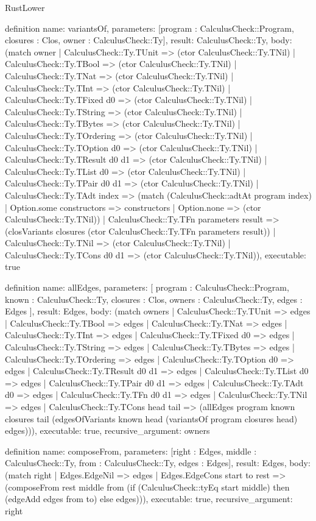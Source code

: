 \begin{lexlean}{RustLower}
\begin{semanticmodule}
definition{
  name: variantsOf,
  parameters: [program : CalculusCheck::Program, closures : Clos, owner : CalculusCheck::Ty],
  result: CalculusCheck::Ty,
  body: (match owner
    | CalculusCheck::Ty.TUnit => (ctor CalculusCheck::Ty.TNil)
    | CalculusCheck::Ty.TBool => (ctor CalculusCheck::Ty.TNil)
    | CalculusCheck::Ty.TNat => (ctor CalculusCheck::Ty.TNil)
    | CalculusCheck::Ty.TInt => (ctor CalculusCheck::Ty.TNil)
    | CalculusCheck::Ty.TFixed d0 => (ctor CalculusCheck::Ty.TNil)
    | CalculusCheck::Ty.TString => (ctor CalculusCheck::Ty.TNil)
    | CalculusCheck::Ty.TBytes => (ctor CalculusCheck::Ty.TNil)
    | CalculusCheck::Ty.TOrdering => (ctor CalculusCheck::Ty.TNil)
    | CalculusCheck::Ty.TOption d0 => (ctor CalculusCheck::Ty.TNil)
    | CalculusCheck::Ty.TResult d0 d1 => (ctor CalculusCheck::Ty.TNil)
    | CalculusCheck::Ty.TList d0 => (ctor CalculusCheck::Ty.TNil)
    | CalculusCheck::Ty.TPair d0 d1 => (ctor CalculusCheck::Ty.TNil)
    | CalculusCheck::Ty.TAdt index => (match (CalculusCheck::adtAt program index)
      | Option.some constructors => constructors
      | Option.none => (ctor CalculusCheck::Ty.TNil))
    | CalculusCheck::Ty.TFn parameters result => (closVariants closures (ctor CalculusCheck::Ty.TFn parameters result))
    | CalculusCheck::Ty.TNil => (ctor CalculusCheck::Ty.TNil)
    | CalculusCheck::Ty.TCons d0 d1 => (ctor CalculusCheck::Ty.TNil)),
  executable: true
}

definition{
  name: allEdges,
  parameters: [
    program : CalculusCheck::Program,
    known : CalculusCheck::Ty,
    closures : Clos,
    owners : CalculusCheck::Ty,
    edges : Edges
  ],
  result: Edges,
  body: (match owners
    | CalculusCheck::Ty.TUnit => edges
    | CalculusCheck::Ty.TBool => edges
    | CalculusCheck::Ty.TNat => edges
    | CalculusCheck::Ty.TInt => edges
    | CalculusCheck::Ty.TFixed d0 => edges
    | CalculusCheck::Ty.TString => edges
    | CalculusCheck::Ty.TBytes => edges
    | CalculusCheck::Ty.TOrdering => edges
    | CalculusCheck::Ty.TOption d0 => edges
    | CalculusCheck::Ty.TResult d0 d1 => edges
    | CalculusCheck::Ty.TList d0 => edges
    | CalculusCheck::Ty.TPair d0 d1 => edges
    | CalculusCheck::Ty.TAdt d0 => edges
    | CalculusCheck::Ty.TFn d0 d1 => edges
    | CalculusCheck::Ty.TNil => edges
    | CalculusCheck::Ty.TCons head tail => (allEdges program known closures tail (edgesOfVariants known head (variantsOf program closures head) edges))),
  executable: true,
  recursive_argument: owners
}

definition{
  name: composeFrom,
  parameters: [right : Edges, middle : CalculusCheck::Ty, from : CalculusCheck::Ty, edges : Edges],
  result: Edges,
  body: (match right
    | Edges.EdgeNil => edges
    | Edges.EdgeCons start to rest => (composeFrom rest middle from (if (CalculusCheck::tyEq start middle) then (edgeAdd edges from to) else edges))),
  executable: true,
  recursive_argument: right
}


\end{semanticmodule}
\end{lexlean}
